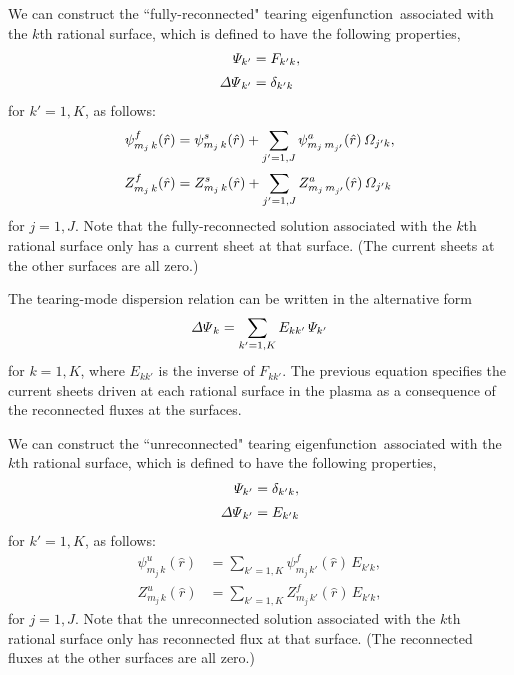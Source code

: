 \documentclass[12pt,prb,aps]{revtex4-1}
\begin{document}
We can construct the ``fully-reconnected" tearing eigenfunction\,\cite{am1} associated with the $k$th rational surface,
which is defined to have the following properties, 
\begin{align}
{\mit\Psi}_{k' }&= F_{k'k},\\[0.5ex]
{\mit\Delta\Psi}_{k'} &= \delta_{k'k}
\end{align}
for $k'=1,K$, 
as follows: 
\begin{align}
\psi_{m_j\,k}^{f}(\hat{r}) &=\psi^s_{m_j\,k}(\hat{r})+ \sum_{j'=1,J}\psi_{m_j\,m_{j'}}^a(\hat{r})\,{\mit\Omega}_{j'k},\\[0.5ex]
Z_{m_j\,k}^{f}(\hat{r}) &=Z^s_{m_j\,k}(\hat{r})+ \sum_{j'=1,J}Z_{m_j\,m_{j'}}^a(\hat{r})\,{\mit\Omega}_{j'k}
\end{align}
for $j=1,J$. Note that the fully-reconnected solution associated with the $k$th rational surface only has a current sheet at that surface. 
(The current sheets at the other surfaces are all zero.)

The tearing-mode dispersion relation can be written in the alternative form\,\cite{cht,am1}
\begin{equation}\label{e317}
{\mit\Delta\Psi}_k = \sum_{k'=1,K}E_{kk'}\,{\mit\Psi}_{k'}
\end{equation}
for $k=1,K$, where $E_{kk'}$ is the inverse of $F_{kk'}$. The previous equation specifies the current sheets driven at each rational surface
in the plasma as a consequence of the reconnected fluxes at the surfaces. 

We can construct the ``unreconnected" tearing eigenfunction\,\cite{am1} associated with the $k$th rational surface,
which is defined to have the following properties, 
\begin{align}
{\mit\Psi}_{k' }&= \delta_{k'k},\\[0.5ex]
{\mit\Delta\Psi}_{k'} &= E_{k'k}
\end{align}
for $k'=1,K$, 
as follows: 
\begin{align}
\psi_{m_j\,k}^{u}(\hat{r}) &=\sum_{k'=1,K}\psi_{m_j\,k'}^{f}(\hat{r})\,E_{k'k},\\[0.5ex]
Z_{m_j\,k}^{u}(\hat{r}) &=\sum_{k'=1,K}Z_{m_j\,k'}^{f}(\hat{r})\,E_{k'k},
\end{align}
for $j=1,J$.  Note that the unreconnected solution associated with the $k$th rational surface only has reconnected flux at that surface. 
(The reconnected fluxes at the other surfaces are all zero.)
\end{document}

